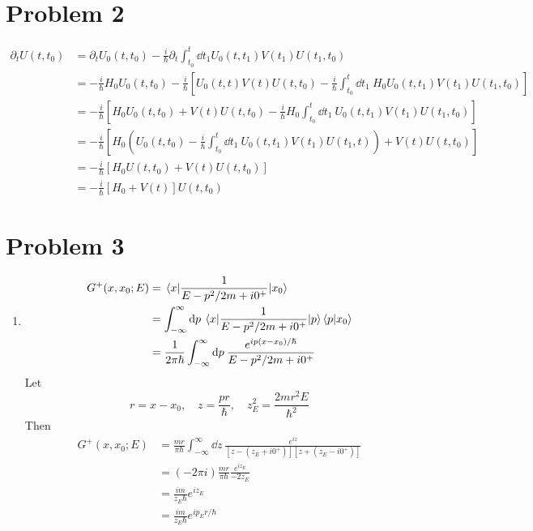 \documentclass[12pt]{article}
\newcommand{\fullint}{\int_{-\infty}^\infty}
\newcommand{\fullintd}[1]{\fullint\dd#1\:}
\newcommand{\cint}[2]{\int_{#1}^{#2}}
\newcommand{\cintd}[3]{\cint{#1}{#2}\dd#3\:}
\begin{document}
\section*{Problem 2}
\begin{align*}
    \partial_t U(t,t_0) &= \partial_t U_0(t,t_0) -\frac{i}{\hbar}\partial_t\cint{t_0}{t}\dd t_1 U_0(t,t_1)V(t_1)U(t_1,t_0) \\
    &= -\frac{i}{\hbar}H_0U_0(t,t_0) -\frac{i}{\hbar}\left[U_0(t,t)V(t)U(t,t_0) - \frac{i}{\hbar}\cintd{t_0}{t}{t_1} H_0U_0(t,t_1)V(t_1)U(t_1,t_0)\right] \\
    &= -\frac{i}{\hbar}\left[H_0U_0(t,t_0) + V(t)U(t,t_0) - \frac{i}{\hbar}H_0\cintd{t_0}{t}{t_1}U_0(t,t_1)V(t_1)U(t_1,t_0) \right] \\
    &= -\frac{i}{\hbar}\left[H_0\left(U_0(t,t_0)-\frac{i}{\hbar}\cintd{t_0}{t}{t_1}U_0(t,t_1)V(t_1)U(t_1,t)\right) + V(t)U(t,t_0)\right] \\
    &= -\frac{i}{\hbar}\left[H_0U(t,t_0) + V(t)U(t,t_0)\right] \\
    &= -\frac{i}{\hbar}\left[H_0 + V(t)\right]U(t,t_0)
\end{align*}


\section*{Problem 3}
\begin{enumerate}[label=(\alph*)]
    \item 
    \begin{align*}
        G^+(x,x_0;E) &= \mel{x}{\frac{1}{E - p^2/2m + i0^+}}{x_0} \\
        &= \fullintd{p} \mel{x}{\frac{1}{E-p^2/2m + i0^+}}{p}\braket{p}{x_0} \\
        &= \frac{1}{2\pi\hbar}\fullintd{p}\frac{e^{ip(x-x_0)/\hbar}}{E-p^2/2m + i0^+}
    \end{align*}
    Let
    \[ r = x-x_0, \quad z = \frac{pr}{\hbar}, \quad z_E^2 = \frac{2mr^2E}{\hbar^2} \]
    Then
    \begin{align*}
        G^+(x,x_0;E) &= \frac{mr}{\pi\hbar}\fullintd{z} \frac{e^{iz}}{\left[z - (z_E + i0^+)\right]\left[z + (z_E - i0^+)\right]} \\
        &= (-2\pi i)\frac{mr}{\pi\hbar}\frac{e^{iz_E}}{-2z_E} \\
        &= \frac{im}{z_E\hbar}e^{iz_E} \\
        &= \frac{im}{z_E\hbar}e^{ip_E r/\hbar}
    \end{align*}
\end{enumerate}
\end{document}
